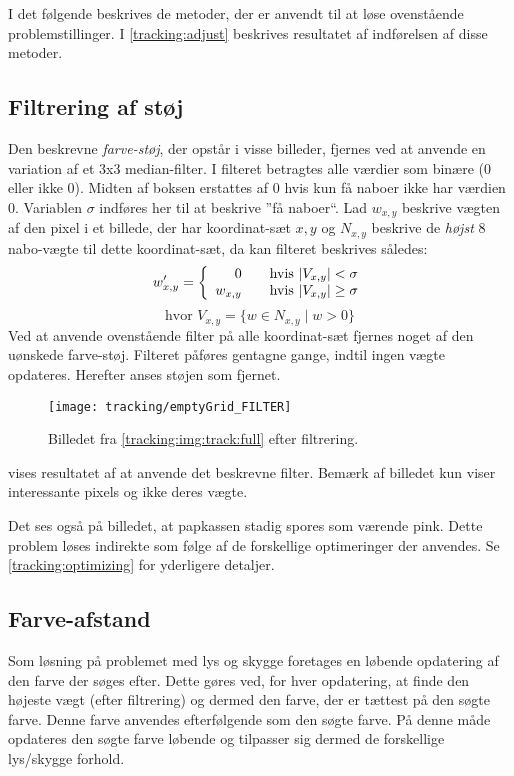 I det følgende beskrives de metoder, der er anvendt til at løse ovenstående problemstillinger.
I \cref{tracking:adjust} beskrives resultatet af indførelsen af disse metoder.

\subsection{Filtrering af støj}
Den beskrevne \emph{farve-støj}, der opstår i visse billeder, fjernes ved at anvende en variation af et 3x3 median-filter\cite{medianfilter}.
I filteret betragtes alle værdier som binære (0 eller ikke 0).
Midten af boksen erstattes af 0 hvis kun få naboer ikke har værdien 0.
Variablen $\sigma$ indføres her til at beskrive ''få naboer``.
Lad $w_{x,y}$ beskrive vægten af den pixel i et billede, der har koordinat-sæt $x,y$ og $N_{x,y}$ beskrive de \emph{højst} 8 nabo-vægte til dette koordinat-sæt, da kan filteret beskrives således:
\begin{equation}\label{tracking:eq:filter}
w_{x,y}' = \left\{ 
  \begin{array}{r l}
        0 & \quad \text{hvis $|V_{x,y}| < \sigma$} \\
        w_{x,y} & \quad \text{hvis $|V_{x,y}| \geq \sigma$}
  \end{array} \right.
\end{equation}
$$\text{hvor } V_{x,y} = \{ w \in N_{x,y} \mid w > 0 \}$$
Ved at anvende ovenstående filter på alle koordinat-sæt fjernes noget af den uønskede farve-støj.
Filteret påføres gentagne gange, indtil ingen vægte opdateres.
Herefter anses støjen som fjernet.

\begin{figure}[h]
\centering
\texttt{[image: tracking/emptyGrid\_FILTER]}
\caption{Billedet fra \cref{tracking:img:track:full} efter filtrering.}
\label{tracking:img:filter}
\end{figure}

 vises resultatet af at anvende det beskrevne filter.
Bemærk af billedet kun viser interessante pixels og ikke deres vægte.

Det ses også på billedet, at papkassen stadig spores som værende pink.
Dette problem løses indirekte som følge af de forskellige optimeringer der anvendes.
Se \cref{tracking:optimizing} for yderligere detaljer.

\subsection{Farve-afstand}
Som løsning på problemet med lys og skygge foretages en løbende opdatering af den farve der søges efter.
Dette gøres ved, for hver opdatering, at finde den højeste vægt (efter filtrering) og dermed den farve, der er tættest på den søgte farve.
Denne farve anvendes efterfølgende som den søgte farve.
På denne måde opdateres den søgte farve løbende og tilpasser sig dermed de forskellige lys/skygge forhold.

